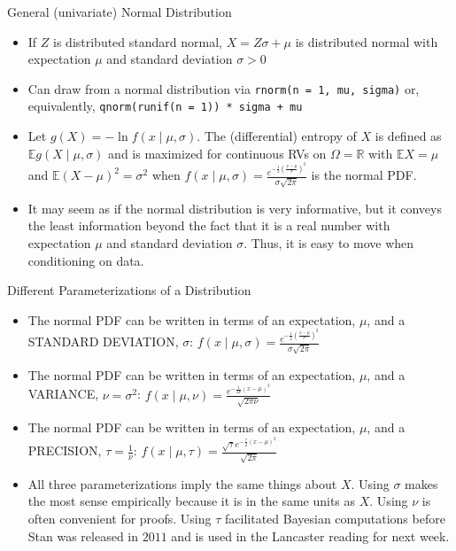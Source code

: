 \documentclass[
  ignorenonframetext,
]{beamer}
\providecommand{\tightlist}{%
  \setlength{\itemsep}{0pt}\setlength{\parskip}{0pt}}
\begin{document}
\begin{frame}[fragile]{General (univariate) Normal Distribution}
\protect\hypertarget{general-univariate-normal-distribution}{}
\begin{itemize}
\tightlist
\item
  If \(Z\) is distributed standard normal, \(X = Z \sigma + \mu\) is
  distributed normal with expectation \(\mu\) and standard deviation
  \(\sigma > 0\)
\item
  Can draw from a normal distribution via
  \texttt{rnorm(n\ =\ 1,\ mu,\ sigma)} or, equivalently,
  \texttt{qnorm(runif(n\ =\ 1))\ *\ sigma\ +\ mu}
\item
  Let \(g\left(X\right) = -\ln f\left(x \mid \mu, \sigma\right)\). The
  (differential) entropy of \(X\) is defined as
  \(\mathbb{E}g\left(X \mid \mu, \sigma\right)\) and is maximized for
  continuous RVs on \(\Omega = \mathbb{R}\) with \(\mathbb{E}X = \mu\)
  and \(\mathbb{E}\left(X - \mu\right)^2 = \sigma^2\) when
  \(f\left(x \mid \mu, \sigma\right) = \frac{e^{-\frac{1}{2} \left(\frac{x - \mu}{\sigma}\right)^2}}{\sigma \sqrt{2 \pi}}\)
  is the normal PDF.
\item
  It may seem as if the normal distribution is very informative, but it
  conveys the least information beyond the fact that it is a real number
  with expectation \(\mu\) and standard deviation \(\sigma\). Thus, it
  is easy to move when conditioning on data.
\end{itemize}
\end{frame}

\begin{frame}{Different Parameterizations of a Distribution}
\protect\hypertarget{different-parameterizations-of-a-distribution}{}
\begin{itemize}
\tightlist
\item
  The normal PDF can be written in terms of an expectation, \(\mu\), and
  a STANDARD DEVIATION, \(\sigma\):
  \(f\left(x \mid \mu, \sigma\right) = \frac{e^{-\frac{1}{2}\left(\frac{x - \mu}{\sigma}\right)^2}}{\sigma\sqrt{2\pi}}\)
\item
  The normal PDF can be written in terms of an expectation, \(\mu\), and
  a VARIANCE, \(\nu = \sigma^2\):
  \(f\left(x \mid \mu, \nu\right) = \frac{e^{-\frac{1}{2\nu}\left(x - \mu\right)^2}}{\sqrt{2\pi\nu}}\)
\item
  The normal PDF can be written in terms of an expectation, \(\mu\), and
  a PRECISION, \(\tau = \frac{1}{\nu}\):
  \(f\left(x \mid \mu, \tau\right) = \frac{\sqrt{\tau} e^{-\frac{\tau}{2}\left(x - \mu\right)^2}}{\sqrt{2\pi}}\)
\item
  All three parameterizations imply the same things about \(X\). Using
  \(\sigma\) makes the most sense empirically because it is in the same
  units as \(X\). Using \(\nu\) is often convenient for proofs. Using
  \(\tau\) facilitated Bayesian computations before Stan was released in
  \(2011\) and is used in the Lancaster reading for next week.
\end{itemize}
\end{frame}
\end{document}
